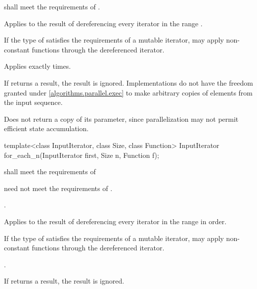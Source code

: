 \begin{itemdescr}
\pnum
\requires
{} shall meet the requirements of .

\pnum
\effects
Applies  to the result of dereferencing every iterator in the range
.
\begin{note}
If the type of  satisfies the requirements of a mutable iterator,
 may apply non-constant functions through the dereferenced iterator.
\end{note}

\pnum
\complexity
Applies  exactly  times.

\pnum
\remarks
If  returns a result, the result is ignored.  Implementations do not
have the freedom granted under \ref{algorithms.parallel.exec} to make arbitrary
copies of elements from the input sequence.

\pnum
\begin{note}
Does not return a copy of its  parameter, since
parallelization may not permit efficient state accumulation.
\end{note}
\end{itemdescr}

%
\begin{itemdecl}
template<class InputIterator, class Size, class Function>
  InputIterator for_each_n(InputIterator first, Size n, Function f);
\end{itemdecl}

\begin{itemdescr}
\pnum
\requires
{} shall meet the requirements of 
\begin{note}  need not meet the requirements of
. \end{note}

\pnum
\requires
{}.

\pnum
\effects
Applies  to the result of dereferencing every iterator in the range
 in order.
\begin{note}
If the type of  satisfies the requirements of a mutable iterator,
 may apply non-constant functions through the dereferenced iterator.
\end{note}

\pnum
\returns
{}.

\pnum
\remarks
If  returns a result, the result is ignored.
\end{itemdescr}

